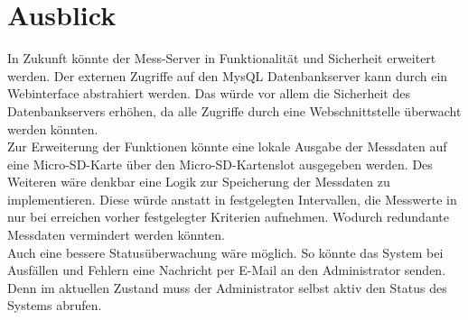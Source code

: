 \section{Ausblick}

In Zukunft könnte der Mess-Server in Funktionalität und Sicherheit erweitert werden. Der externen Zugriffe auf den MysQL Datenbankserver kann durch ein Webinterface abstrahiert werden. Das würde vor allem die Sicherheit des Datenbankservers erhöhen, da alle Zugriffe durch eine Webschnittstelle überwacht werden könnten.\\
Zur Erweiterung der Funktionen könnte eine lokale Ausgabe der Messdaten auf eine Micro-SD-Karte über den Micro-SD-Kartenslot ausgegeben werden. Des Weiteren wäre denkbar eine Logik zur Speicherung der Messdaten zu implementieren. Diese würde anstatt in festgelegten Intervallen, die Messwerte in nur bei erreichen vorher festgelegter Kriterien aufnehmen. Wodurch redundante Messdaten vermindert werden könnten.\\
Auch eine bessere Statusüberwachung wäre möglich. So könnte das System bei Ausfällen und Fehlern eine Nachricht per E-Mail an den Administrator senden. Denn im aktuellen Zustand muss der Administrator selbst aktiv den Status des Systems abrufen.